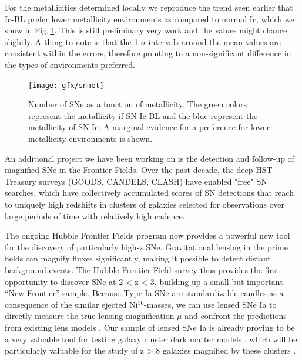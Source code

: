 For the metallicities determined locally we reproduce the trend seen earlier
that Ic-BL prefer lower metallicity environments as compared to normal Ic, which
we show in Fig.\,\ref{fig:intro:snmet}. This is still preliminary very work
and the values might chance slightly. A thing to note is that the 1-$\sigma$
intervals around the mean values are consistent within the errors, therefore
pointing to a non-significant difference in the types of environments preferred.



\begin{figure}[htb]
	
	\texttt{[image: gfx/snmet]}
	
	\caption{Number of SNe as a function of metallicity. The green colors represent the metallicity if SN Ic-BL and the blue represent the metallicity of SN Ic. A marginal evidence for a preference for lower-metallicity environments is shown.}
	
	\label{fig:intro:snmet}
\end{figure}

An additional project we have been working on is the detection and follow-up of
magnified SNe in the Frontier Fields.
Over the past decade, the deep HST
Treasury surveys (GOODS, CANDELS, CLASH) have
enabled "free" SN searches, which
have collectively
accumulated scores of SN detections that reach to uniquely
high redshifts
\citep{Riess2007, Rodney2014b, Graur2014} in clusters of galaxies
selected for observations over large periods of time with relatively high
cadence.

The ongoing Hubble Frontier Fields program now provides a powerful new tool for
the discovery of
particularly high-z SNe. Gravitational lensing in the prime
fields can
magnify fluxes significantly, making it possible to detect distant
background
events. 
The Hubble Frontier Field survey thus provides the first
opportunity to discover
SNe at 2 < z < 3, building up a small but important “New
Frontier” sample.
Because Type Ia SNe are standardizable candles as a
consequence of the similar ejected Ni$^{56}$-masses, we can use lensed SNe Ia to
directly measure the true lensing magnification $\mu$ and confront the
predictions from existing lens models \citep[e.g.][]{Riehm2011, Li2012,
Patel2014}. Our sample of lensed SNe Ia is already proving
to be a very valuable
tool for testing galaxy cluster dark matter models \citep{Rodney2015}, which
will be particularly valuable for the study of z > 8 galaxies magnified by these
clusters \citep[e.g.][]{Zheng2012}.



